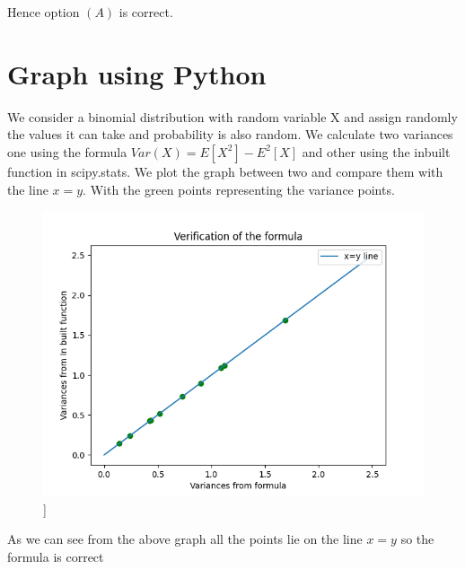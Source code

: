 \documentclass[journal,12pt,twocolumn]{IEEEtran}
\providecommand{\brak}[1]{\ensuremath{\left(#1\right)}}
\begin{document}
Hence option $\brak{A}$ is correct.



\section*{Graph using Python}
We consider a binomial distribution with random variable X and assign randomly the values it can take and probability is also random. We calculate two variances one using the formula $Var\brak{X}=E[X^2]-E^2[X]$ and other using the inbuilt function in scipy.stats. We plot the graph between two and compare them with the line $x=y$. With the green points representing the variance points.

\begin{figure}[h]
\includegraphics[scale = 0.7]{ogimage}]
\end{figure}
As we can see from the above graph all the points lie on the line $x=y$ so the formula is correct \\\\
\end{document}
